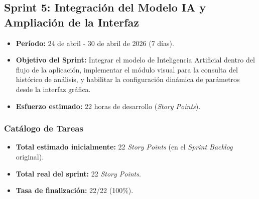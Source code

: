 \subsection{Sprint 5: Integración del Modelo IA y Ampliación de la Interfaz}

\begin{itemize}
    \item \textbf{Período:} 24 de abril - 30 de abril de 2026 (7 días).
    \item \textbf{Objetivo del Sprint:} Integrar el modelo de Inteligencia Artificial dentro del flujo de la aplicación, implementar el módulo visual para la consulta del histórico de análisis, y habilitar la configuración dinámica de parámetros desde la interfaz gráfica.
    \item \textbf{Esfuerzo estimado:} 22 horas de desarrollo (\textit{Story Points}).
\end{itemize}

\subsubsection{Catálogo de Tareas}

\begin{table}[H]
    \centering
    \caption{Catálogo de tareas del Sprint 5.}
\end{table}

\begin{itemize}
    \item \textbf{Total estimado inicialmente:} 22 \textit{Story Points} (en el \textit{Sprint Backlog} original).
    \item \textbf{Total real del sprint:} 22 \textit{Story Points}.
    \item \textbf{Tasa de finalización:} 22/22 (100\%).
\end{itemize}

